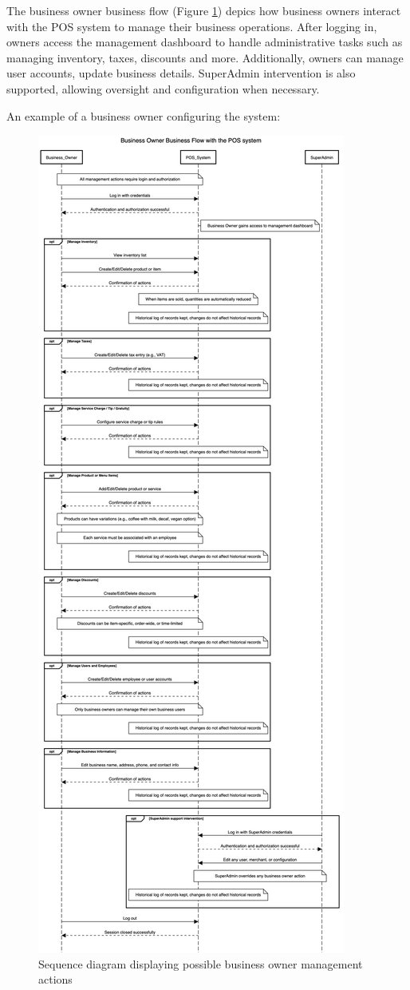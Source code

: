 \documentclass[11pt,a4paper,pdftex]{article}
\begin{document}
The business owner business flow (Figure \ref{figures:sequence_business_owner}) depics how business owners interact with the POS system to manage their business operations. After logging in, owners access the management dashboard to handle administrative tasks such as managing inventory, taxes, discounts and more. Additionally, owners can manage user accounts, update business details. 
SuperAdmin intervention is also supported, allowing oversight and configuration when necessary. 

An example of a business owner configuring the system:

\begin{figure}[H]
    \centering
    \includegraphics[scale=0.22]{graphics/business owner.png}
    \caption{Sequence diagram displaying possible business owner management actions}
    \label{figures:sequence_business_owner}
\end{figure}
\end{document}
